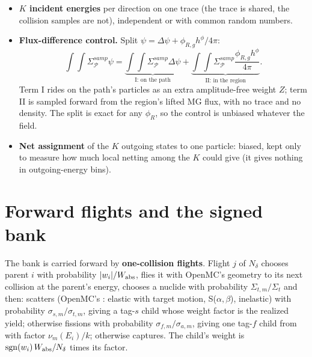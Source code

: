 \begin{itemize}
\item \textbf{$K$ incident energies} per direction on one trace (the trace is shared, the collision
  samples are not), independent or with common random numbers.
\item \textbf{Flux-difference control.} Split $\psi=\Delta\psi+\phi_{R,g}h^\phi/4\pi$:
\begin{equation}
\int\!\!\int\Sigma^{samp}_{\mathcal P}\psi=\underbrace{\int\!\!\int\Sigma^{samp}_{\mathcal P}\Delta\psi}_{\text{I: on the path}}
+\underbrace{\int\!\!\int\Sigma^{samp}_{\mathcal P}\frac{\phi_{R,g}h^\phi}{4\pi}}_{\text{II: in the region}} .
\end{equation}
  Term I rides on the path's particles as an extra amplitude-free weight $Z$; term II is sampled
  forward from the region's lifted MG flux, with no trace and no density. The split is exact for any
  $\phi_R$, so the control is unbiased whatever the field.
\item \textbf{Net assignment} of the $K$ outgoing states to one particle: biased, kept only to measure
  how much local netting among the $K$ could give (it gives nothing in outgoing-energy bins).
\end{itemize}

\section{Forward flights and the signed bank}\label{sec:flights}

The bank is carried forward by \textbf{one-collision flights}. Flight $j$ of $N_\delta$ chooses parent
$i$ with probability $|w_i|/W_{\mathrm{abs}}$, flies it with OpenMC's geometry to its next collision at the
parent's energy, chooses a nuclide with probability $\Sigma_{t,m}/\Sigma_t$ and then:
scatters (OpenMC's : elastic with target motion, S($\alpha,\beta$), inelastic) with
probability $\sigma_{s,m}/\sigma_{t,m}$, giving a tag-$s$ child whose weight factor is the realized
yield; otherwise fissions with probability $\sigma_{f,m}/\sigma_{a,m}$, giving one tag-$f$ child from
 with factor $\nu_m(E_i)/k$; otherwise captures. The child's weight
is $\mathrm{sgn}(w_i)\,W_{\mathrm{abs}}/N_\delta$ times its factor.

